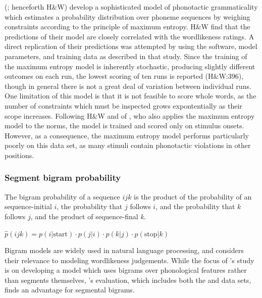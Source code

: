 \citeauthor{Hayes2008a} (\citeyear{Hayes2008a}; henceforth H\&W) develop a sophisticated model of phonotactic grammaticality which estimates a probability distribution over phoneme sequences by weighing constraints according to the principle of maximum entropy. H\&W find that the predictions of their model are closely correlated with the \citet{Scholes1966} wordlikeness ratings. A direct replication of their predictions was attempted by using the software, model parameters, and training data as described in that study. Since the training of the maximum entropy model is inherently stochastic, producing slightly different outcomes on each run, the lowest scoring of ten runs is reported (H\&W:396), though in general there is not a great deal of variation between individual runs. One limitation of this model is that it is not feasible to score whole words, as the number of constraints which must be inspected grows expontentially as their scope increases. Following H\&W and of \citet{Albright2009a}, who also applies the maximum entropy model to the \citet{Albright2003b} norms, the model is trained and scored only on stimulus onsets. However, as a consequence, the maximum entropy model performs particularly poorly on this data set, as many stimuli contain phonotactic violations in other positions.

\subsubsection{Segment bigram probability}

The bigram probability of a sequence $ijk$ is the product of the probability of an sequence-initial $i$, the probability that $j$ follows $i$, and the probability that $k$ follows $j$, and the product of sequence-final \emph{k}.

\begin{unlabeledexample}
$\displaystyle \hat{p}(ijk) = p(i|\textrm{start}) \cdot p(j|i) \cdot p(k|j) \cdot p(\textrm{stop}|k)$
\end{unlabeledexample}

\noindent Bigram models are widely used in natural language processing, and \citet{Albright2009a} considers their relevance to modeling wordlikeness judgements. While the focus of \citeauthor{Albright2009a}'s study is on developing a model which uses bigrams over phonological features rather than segments themselves, \citeauthor{Albright2009a}'s evaluation, which includes both the \citeauthor{Scholes1966} and \citeauthor{Albright2003b} data sets, finds an advantage for segmental bigrams. 

